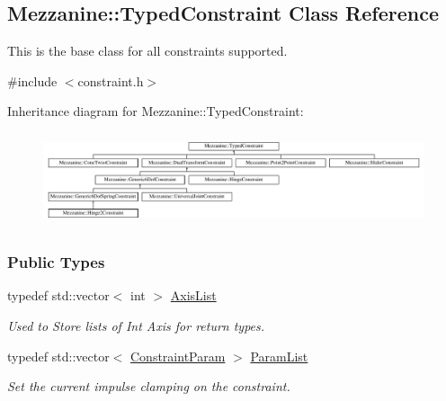 \hypertarget{classMezzanine_1_1TypedConstraint}{
\subsection{Mezzanine::TypedConstraint Class Reference}
\label{classMezzanine_1_1TypedConstraint}
}


This is the base class for all constraints supported.  




{\ttfamily \#include $<$constraint.h$>$}

Inheritance diagram for Mezzanine::TypedConstraint:\begin{figure}[H]
\begin{center}
\leavevmode
\includegraphics[height=2.766798cm]{classMezzanine_1_1TypedConstraint}
\end{center}
\end{figure}
\subsubsection*{Public Types}
\begin{DoxyCompactItemize}
\item 
typedef std::vector$<$ int $>$ \hyperlink{classMezzanine_1_1TypedConstraint_ac6b8e0839cd686f73d0c9e9ad5db47a4}{AxisList}
\begin{DoxyCompactList}\small\item\em Used to Store lists of Int Axis for return types. \item\end{DoxyCompactList}\item 
typedef std::vector$<$ \hyperlink{namespaceMezzanine_a6c62e8c2938fb203eb7a7072c12176f4}{ConstraintParam} $>$ \hyperlink{classMezzanine_1_1TypedConstraint_abd499db29c9e9755e9bb547d29eaa49a}{ParamList}
\begin{DoxyCompactList}\small\item\em Set the current impulse clamping on the constraint. \item\end{DoxyCompactList}\end{DoxyCompactItemize}
